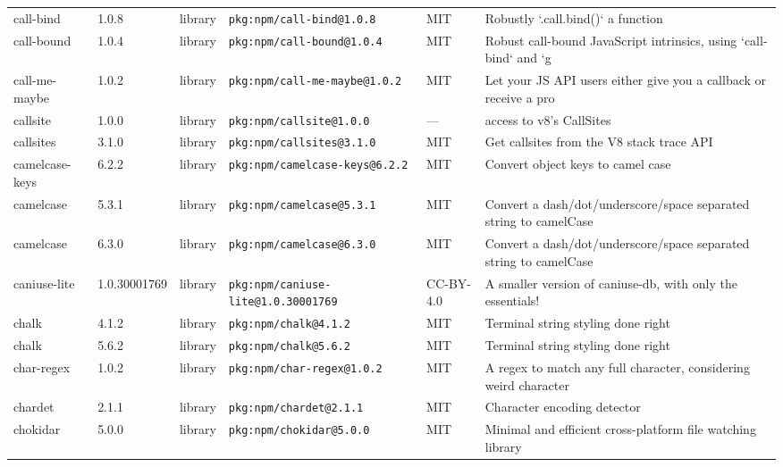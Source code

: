 \documentclass[11pt,a4paper]{article}
\begin{document}
\begin{longtable}{|p{4cm}|p{2cm}|p{1.6cm}|p{5cm}|p{1.5cm}|p{3.5cm}|}
\raggedright call-bind & 1.0.8 & library & \small\texttt{pkg:npm/call-bind@1.0.8} & MIT & \small Robustly `.call.bind()` a function \\
\raggedright call-bound & 1.0.4 & library & \small\texttt{pkg:npm/call-bound@1.0.4} & MIT & \small Robust call-bound JavaScript intrinsics, using `call-bind` and `g \\
\raggedright call-me-maybe & 1.0.2 & library & \small\texttt{pkg:npm/call-me-maybe@1.0.2} & MIT & \small Let your JS API users either give you a callback or receive a pro \\
\raggedright callsite & 1.0.0 & library & \small\texttt{pkg:npm/callsite@1.0.0} & — & \small access to v8's CallSites \\
\raggedright callsites & 3.1.0 & library & \small\texttt{pkg:npm/callsites@3.1.0} & MIT & \small Get callsites from the V8 stack trace API \\
\raggedright camelcase-keys & 6.2.2 & library & \small\texttt{pkg:npm/camelcase-keys@6.2.2} & MIT & \small Convert object keys to camel case \\
\raggedright camelcase & 5.3.1 & library & \small\texttt{pkg:npm/camelcase@5.3.1} & MIT & \small Convert a dash/dot/underscore/space separated string to camelCase \\
\raggedright camelcase & 6.3.0 & library & \small\texttt{pkg:npm/camelcase@6.3.0} & MIT & \small Convert a dash/dot/underscore/space separated string to camelCase \\
\raggedright caniuse-lite & 1.0.30001769 & library & \small\texttt{pkg:npm/caniuse-lite@1.0.30001769} & CC-BY-4.0 & \small A smaller version of caniuse-db, with only the essentials! \\
\raggedright chalk & 4.1.2 & library & \small\texttt{pkg:npm/chalk@4.1.2} & MIT & \small Terminal string styling done right \\
\raggedright chalk & 5.6.2 & library & \small\texttt{pkg:npm/chalk@5.6.2} & MIT & \small Terminal string styling done right \\
\raggedright char-regex & 1.0.2 & library & \small\texttt{pkg:npm/char-regex@1.0.2} & MIT & \small A regex to match any full character, considering weird character  \\
\raggedright chardet & 2.1.1 & library & \small\texttt{pkg:npm/chardet@2.1.1} & MIT & \small Character encoding detector \\
\raggedright chokidar & 5.0.0 & library & \small\texttt{pkg:npm/chokidar@5.0.0} & MIT & \small Minimal and efficient cross-platform file watching library \\

\end{longtable}
\end{document}
